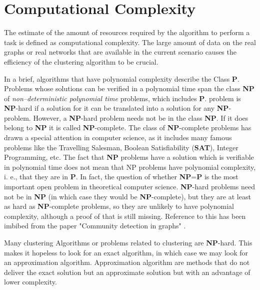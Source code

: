 \section{Computational Complexity}
 The estimate of the amount of resources required by the algorithm to perform a task is defined as computational complexity. The large amount of data on the real graphs or real networks that are available in the current scenario causes the efficiency of the clustering algorithm to be crucial.
\par In a brief, algorithms that have polynomial complexity describe the Class \textbf{P}. Problems whose solutions can be verified in a polynomial time span the class \textbf{NP} of \textit{non--deterministic polynomial time} problems, which includes \textbf{P}. problem is \textbf{NP}-hard if a solution for it can be
translated into a solution for any \textbf{NP}-problem. However,
a \textbf{NP}-hard problem needs not be in the class \textbf{NP}. If it
does belong to \textbf{NP} it is called \textbf{NP}-complete. The class
of \textbf{NP}-complete problems has drawn a special attention
in computer science, as it includes many famous problems like the Travelling Salesman, Boolean Satisfiability
(\textbf{SAT}), Integer Programming, etc.
The fact that \textbf{NP} problems have a solution which is verifiable in polynomial
time does not mean that NP problems have polynomial
complexity, i. e., that they are in \textbf{P}. In fact, the question of whether \textbf{NP}=\textbf{P} is the most important open problem in theoretical computer science. \textbf{NP}-hard problems
need not be in \textbf{NP} (in which case they would be \textbf{NP}-complete), but they are at least as hard as \textbf{NP}-complete
problems, so they are unlikely to have polynomial complexity, although a proof of that is still missing. Reference to this has been imbibed from the paper "Community detection in graphs" \cite{communitypaper}.
\par Many clustering Algorithms or problems related to clustering are \textbf{NP}-hard. This makes it hopeless to look for an exact algorithm, in which case we may look for an approximation algorithm. Approximation algorithm are methods that do not deliver the exact solution but an approximate solution but with an advantage of lower complexity. \cite{communitypaper}

